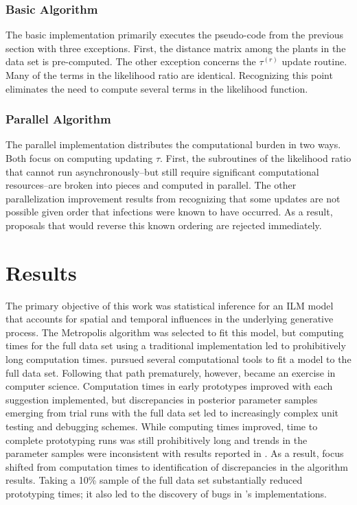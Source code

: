\documentclass{uwstat572}
\begin{document}
\subsubsection{Basic Algorithm}
The basic implementation primarily executes the pseudo-code from the previous section with three exceptions.
First, the distance matrix among the plants in the data set is pre-computed. 
The other exception concerns the $\tau^{(r)}$ update routine. 
Many of the terms in the likelihood ratio are identical. 
Recognizing this point eliminates the need to compute several terms in the likelihood function. 
 
\subsubsection{Parallel Algorithm}
The parallel implementation distributes the computational burden in two ways. 
Both focus on computing updating $\tau$. 
First, the subroutines of the likelihood ratio that cannot run asynchronously--but still require significant computational resources--are broken into pieces and computed in parallel. 
The other parallelization improvement results from recognizing that some updates are not possible given order that infections were known to have occurred. 
As a result, proposals that would reverse this known ordering are rejected immediately. 

\section{Results}
The primary objective of this work was statistical inference for an ILM model that accounts for spatial and temporal influences in the underlying generative process. 
The Metropolis algorithm was selected to fit this model, but computing times for the full data set using a traditional implementation led to prohibitively long computation times. 
\citet{Brown} pursued several computational tools to fit a model to the full data set. 
Following that path prematurely, however, became an exercise in computer science. 
Computation times  in early prototypes improved with each suggestion implemented, but discrepancies in posterior parameter samples emerging from trial runs with the full data set led to increasingly complex unit testing and debugging schemes. 
While computing times improved, time to complete prototyping runs was still prohibitively long and trends in the parameter samples were inconsistent with results reported in \citet{Brown}. 
As a result, focus shifted from computation times to identification of discrepancies in the algorithm results. 
Taking a 10\% sample of the full data set substantially reduced prototyping times; it also led to the discovery of bugs in \citet{Brown}'s implementations. 
\end{document}
